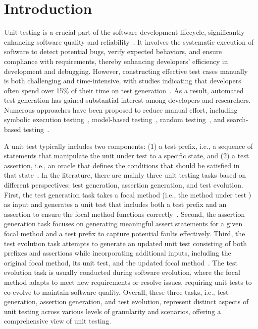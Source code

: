 \sloppy
\section{Introduction}
\label{sec:introduction}



Unit testing is a crucial part of the software development lifecycle, significantly enhancing software quality and reliability~\cite{wang_software_2024,zhang2022test}.
It involves the systematic execution of software to detect potential bugs, verify expected behaviors, and ensure compliance with requirements, thereby enhancing developers' efficiency in development and debugging.
However, constructing effective test cases manually is both challenging and time-intensive, with studies indicating that developers often spend over 15\% of their time on test generation~\cite{daka_survey_2014}.
As a result, automated test generation has gained substantial interest among developers and researchers. Numerous approaches have been proposed to reduce manual effort, including symbolic execution testing~\cite{chipounov_s2e_2011, cadar_symbolic_2011}, model-based testing~\cite{dalal_modelbased_1999, offutt_generating_1999}, random testing~\cite{pacheco_randoop_2007, ma_grt_2015}, and search-based testing~\cite{fraser_evosuite_2011, baresi_testful_2010}.

A unit test typically includes two components: (1) a test prefix, i.e., a sequence of statements that manipulate the unit under test to a specific state, and (2) a test assertion, i.e., an oracle that defines the conditions that should be satisfied in that state~\cite{dinella_toga_2022}. 
In the literature, there are mainly three unit testing tasks based on different perspectives: test generation, assertion generation, and test evolution. 
First, the test generation task takes a focal method (i.e., the method under test ) as input and generates a unit test that includes both a test prefix and an assertion to ensure the focal method functions correctly~\cite{tufano_unit_2021}.
Second, the assertion generation task focuses on generating meaningful assert statements for a given focal method and a test prefix to capture potential faults effectively.
Third, the test evolution task attempts to generate an updated unit test consisting of both prefixes and assertions while incorporating additional inputs, including the original focal method, its unit test, and the updated focal method~\cite{hu_identify_2023}.
The test evolution task is usually conducted during software evolution, where the focal method adapts to meet new requirements or resolve issues, requiring unit tests to co-evolve to maintain software quality. 
Overall, these three tasks, i.e., test generation, assertion generation, and test evolution, represent distinct aspects of unit testing across various levels of granularity and scenarios, offering a comprehensive view of unit testing.





